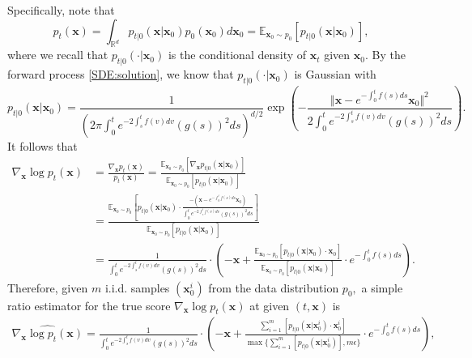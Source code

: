\documentclass[11pt]{article}
\begin{document}
Specifically, note that
\begin{equation*}
p_{t}(\mathbf{x})=\int_{\mathbb{R}^{d}}p_{t|0} (\mathbf{x}|\mathbf{x}_{0})p_{0}(\mathbf{x}_{0})d\mathbf{x}_{0} = \mathbb{E}_{\mathbf{x}_{0} \sim p_0 } [ p_{t|0}(\mathbf{x} | \mathbf{x}_{0})],
\end{equation*}
where we recall that $p_{t|0}(\cdot|\mathbf{x}_{0})$ is the conditional density of  $\mathbf{x}_{t}$ given $\mathbf{x}_{0}$. By the forward process \eqref{SDE:solution}, we know that $p_{t|0}(\cdot|\mathbf{x}_{0})$ is Gaussian with
\begin{equation}\label{eq: conditional_density}
p_{t|0}(\mathbf{x}|\mathbf{x}_{0})
=\frac{1}{\left(2\pi\int_{0}^{t}e^{-2\int_{s}^{t}f(v)dv}(g(s))^{2}ds\right)^{d/2}}\exp\left(-\frac{\Vert\mathbf{x}-e^{-\int_{0}^{t}f(s)ds}\mathbf{x}_{0}\Vert^{2}}{2\int_{0}^{t}e^{-2\int_{s}^{t}f(v)dv}(g(s))^{2}ds}\right).
\end{equation}
It follows that
\begin{align}\label{eq:scoreMC}
\nabla_{\mathbf{x}}\log p_{t}(\mathbf{x}) & = \frac{ \nabla_{\mathbf{x}} p_{t}(\mathbf{x})}{p_{t}(\mathbf{x}) } = \frac{\mathbb{E}_{\mathbf{x}_{0} \sim p_0 } [  \nabla_{\mathbf{x}}  p_{t|0}(\mathbf{x} | \mathbf{x}_{0})]}{ \mathbb{E}_{\mathbf{x}_{0} \sim p_0 } [ p_{t|0}(\mathbf{x} | \mathbf{x}_{0})] }  \nonumber \\
& = \frac{\mathbb{E}_{\mathbf{x}_{0} \sim p_0 } \left[  p_{t|0}(\mathbf{x} | \mathbf{x}_{0})  \cdot  \frac{-( \mathbf{x}-e^{-\int_{0}^{t}f(s)ds}\mathbf{x}_{0}  ) }{ \int_{0}^{t}e^{-2\int_{s}^{t}f(v)dv}(g(s))^{2}ds} \right] }{ \mathbb{E}_{\mathbf{x}_{0} \sim p_0 } [ p_{t|0}(\mathbf{x} | \mathbf{x}_{0})] } \nonumber \\
& = \frac{1} { \int_{0}^{t}e^{-2\int_{s}^{t}f(v)dv}(g(s))^{2}ds} \cdot \left( -  \mathbf{x} +  \frac{\mathbb{E}_{\mathbf{x}_{0} \sim p_0 } \left[  p_{t|0}(\mathbf{x} | \mathbf{x}_{0})  \cdot  {\mathbf{x}_{0}  } \right] }{ \mathbb{E}_{\mathbf{x}_{0} \sim p_0 } [ p_{t|0}(\mathbf{x} | \mathbf{x}_{0})] } \cdot e^{-\int_{0}^{t}f(s)ds}  \right).
\end{align}
Therefore, given $m$ i.i.d. samples $( \mathbf{x}^{i}_{0} )$ from the data distribution $p_0,$
a simple ratio estimator for the true score $\nabla_{\mathbf{x}}\log p_{t}(\mathbf{x}) $ at given $(t,\mathbf{x})$ is
\begin{align}\label{eq:approxi-score}
\widehat{ \nabla_{\mathbf{x}}\log p_{t}(\mathbf{x}) }   = \frac{1} { \int_{0}^{t}e^{-2\int_{s}^{t}f(v)dv}(g(s))^{2}ds} \cdot \left( -  \mathbf{x} +  \frac{ \sum_{i=1}^m  \left[  p_{t|0}(\mathbf{x} | \mathbf{x}^{i}_{0})  \cdot  {\mathbf{x}^{i}_{0}  } \right] }{ \max\{ \sum_{i=1}^m  [ p_{t|0}(\mathbf{x} | \mathbf{x}^i_{0})], m \epsilon \} } \cdot e^{-\int_{0}^{t}f(s)ds}  \right),
\end{align}
\end{document}
